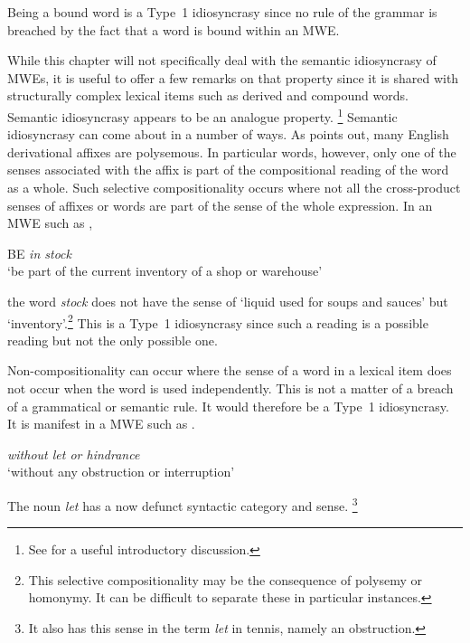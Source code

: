 \documentclass[output=paper]{langsci/langscibook}
\begin{document}
Being a bound word is a Type~1 idiosyncrasy since no rule of the grammar is breached by the fact that a word is bound within an MWE.

\bigskip
While this chapter will not specifically deal with the semantic idiosyncrasy of MWEs, it is useful to offer a few remarks on that property since it is shared with structurally complex lexical items such as derived and compound words. Semantic idiosyncrasy appears to be an analogue 
property.%
\footnote{See \citet{Burger2010} for a useful introductory discussion.} 
%
Semantic idiosyncrasy can come about in a number of ways. As 
\citet{Jackendoff1975} points out, many  English derivational affixes are 
polysemous. In particular words, however, only one of the senses 
associated with the affix is part of the compositional reading of the word 
as a whole. Such selective compositionality occurs where not all the 
cross-product senses of affixes or words are part of the sense of the 
whole expression. In an MWE such as ,

\begin{exe}
\ex\label{ex:ex22}    BE \textit{in stock}\\
  ‘be part of the current inventory of a shop or warehouse’
\end{exe}

\noindent
the word \textit{stock} does not have the sense of ‘liquid used for soups and sauces’ but  ‘inventory’.\footnote{This selective compositionality may be the consequence of polysemy or homonymy. It can be difficult to separate these in particular instances.} This is a Type~1 idiosyncrasy since such a reading is a possible reading but not the only possible one.

Non-compositionality can occur where the sense of a word in a lexical item 
does not occur when the word is used independently. This is not a matter 
of a breach of a grammatical or semantic rule. It would therefore be a 
Type~1 idiosyncrasy. It is manifest in a MWE such as .

\begin{exe}
\ex\label{ex:ex23}    \textit{without let or hindrance}\\
‘without any obstruction or interruption’
\end{exe}

\noindent
The noun \textit{let} has a now defunct syntactic category and sense.%
\footnote{It also has this sense in the term \textit{let} in tennis, namely an obstruction.}
\end{document}
